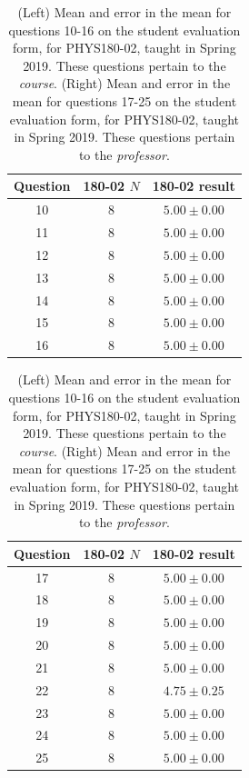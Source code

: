 \documentclass[../../main.tex]{subfiles}
\begin{document}
\begin{table}
\small
\centering
\begin{tabular}{| c | c | c |}
\hline \hline
Question & 180-02 $N$ & 180-02 result \\ \hline
10 & 8 & $5.00\pm 0.00$ \\ \hline
11 & 8 & $5.00\pm 0.00$ \\ \hline
12 & 8 & $5.00\pm 0.00$ \\ \hline
13 & 8 & $5.00\pm 0.00$ \\ \hline
14 & 8 & $5.00\pm 0.00$ \\ \hline
15 & 8 & $5.00\pm 0.00$ \\ \hline
16 & 8 & $5.00\pm 0.00$ \\ \hline
\hline
\end{tabular}
\quad
\begin{tabular}{| c | c | c |}
\hline \hline
Question & 180-02 $N$ & 180-02 result \\ \hline
17 & 8 & $5.00\pm 0.00$ \\ \hline
18 & 8 & $5.00\pm 0.00$ \\ \hline
19 & 8 & $5.00\pm 0.00$ \\ \hline
20 & 8 & $5.00\pm 0.00$ \\ \hline
21 & 8 & $5.00\pm 0.00$ \\ \hline
22 & 8 & $4.75\pm 0.25$ \\ \hline
23 & 8 & $5.00\pm 0.00$ \\ \hline
24 & 8 & $5.00\pm 0.00$ \\ \hline
25 & 8 & $5.00\pm 0.00$ \\ \hline
\hline
\end{tabular}
\caption{\label{tab:courses:intro_eval_3} (Left) Mean and error in the mean for questions 10-16 on the student evaluation form, for PHYS180-02, taught in Spring 2019.  These questions pertain to the \textit{course}.  (Right) Mean and error in the mean for questions 17-25 on the student evaluation form, for PHYS180-02, taught in Spring 2019.  These questions pertain to the \textit{professor}.}
\end{table}
\end{document}
